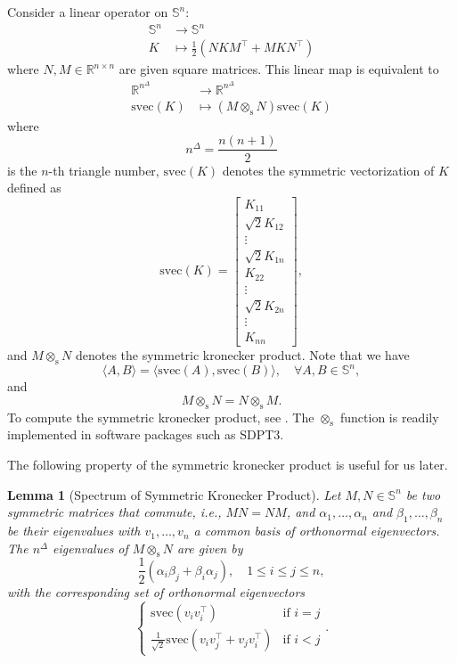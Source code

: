 \documentclass[
]{book}
\newtheorem{lemma}{Lemma}[chapter]
\theoremstyle{definition}
\theoremstyle{definition}
\theoremstyle{definition}
\theoremstyle{definition}
\theoremstyle{remark}
\begin{document}
Consider a linear operator on \(\mathbb{S}^{n}\):
\begin{equation}
\begin{split}
\mathbb{S}^{n} & \rightarrow \mathbb{S}^{n} \\
K & \mapsto \frac{1}{2} \left( N K M^\top+ M K N^\top\right)
\end{split}
\label{eq:linear-opt-Sn}
\end{equation}
where \(N,M\in\mathbb{R}^{n\times n}\) are given square matrices. This linear map is equivalent to
\begin{equation}
\begin{split}
\mathbb{R}^{n^{\Delta}} & \rightarrow \mathbb{R}^{n^{\Delta}} \\
\mathrm{svec}(K) & \mapsto (M \otimes_{\mathrm{s}}N) \mathrm{svec}(K)
\end{split}
\label{eq:linear-opt-Sn-skron}
\end{equation}
where
\[
n^{\Delta} = \frac{n(n+1)}{2}
\]
is the \(n\)-th triangle number, \(\mathrm{svec}(K)\) denotes the symmetric vectorization of \(K\) defined as
\[
\mathrm{svec}(K) = \begin{bmatrix}
K_{11} \\
\sqrt{2} K_{12} \\
\vdots \\
\sqrt{2} K_{1n} \\
K_{22} \\
\vdots \\
\sqrt{2} K_{2n} \\
\vdots \\
K_{nn}
\end{bmatrix},
\]
and \(M \otimes_{\mathrm{s}}N\) denotes the symmetric kronecker product. Note that we have
\[
\langle A, B \rangle = \langle \mathrm{svec}(A), \mathrm{svec}(B) \rangle, \quad \forall A,B \in \mathbb{S}^{n},
\]
and
\[
M \otimes_{\mathrm{s}}N = N \otimes_{\mathrm{s}}M.
\]
To compute the symmetric kronecker product, see \citep{schacke04mthesis-kronecker}. The \(\otimes_{\mathrm{s}}\) function is readily implemented in software packages such as SDPT3.

The following property of the symmetric kronecker product is useful for us later.

\begin{lemma}[Spectrum of Symmetric Kronecker Product]
\protect\hypertarget{lem:SkronEigLemma}{}\label{lem:SkronEigLemma}Let \(M,N \in \mathbb{S}^{n}\) be two symmetric matrices that commute, i.e., \(MN = NM\), and \(\alpha_1,\dots,\alpha_n\) and \(\beta_1,\dots,\beta_n\) be their eigenvalues with \(v_1,\dots,v_n\) a common basis of orthonormal eigenvectors. The \(n^\Delta\) eigenvalues of \(M \otimes_{\mathrm{s}}N\) are given by
\[
\frac{1}{2}(\alpha_i \beta_j + \beta_i \alpha_j), \quad 1 \leq i \leq j \leq n,
\]
with the corresponding set of orthonormal eigenvectors
\[
\begin{cases}
\mathrm{svec}(v_i v_i^\top) & \text{if } i = j \\
\frac{1}{\sqrt{2}} \mathrm{svec}(v_i v_j^\top+ v_j v_i^\top) & \text{if } i < j
\end{cases}.
\]
\end{lemma}
\end{document}

